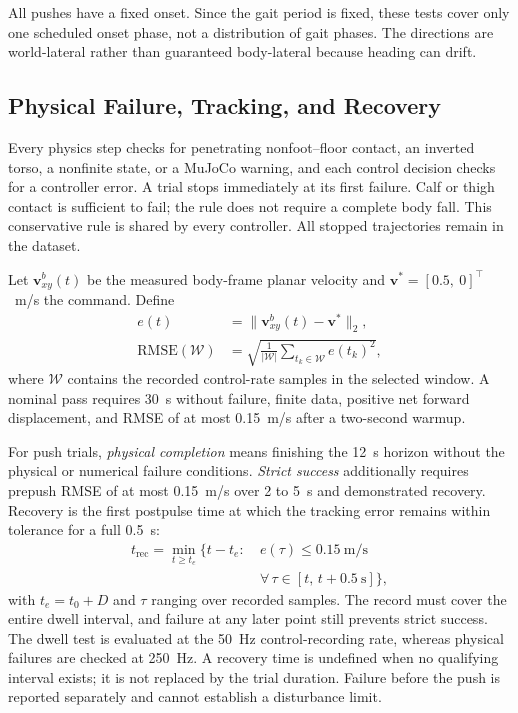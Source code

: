 \documentclass[conference]{IEEEtran}
\begin{document}
All pushes have a fixed onset. Since the gait period is fixed, these tests cover only one scheduled onset phase, not a distribution of gait phases. The directions are world-lateral rather than guaranteed body-lateral because heading can drift.

\subsection{Physical Failure, Tracking, and Recovery}

Every physics step checks for penetrating nonfoot--floor contact, an inverted torso, a nonfinite state, or a MuJoCo warning, and each control decision checks for a controller error. A trial stops immediately at its first failure. Calf or thigh contact is sufficient to fail; the rule does not require a complete body fall. This conservative rule is shared by every controller. All stopped trajectories remain in the dataset.

Let $\mathbf v_{xy}^{b}(t)$ be the measured body-frame planar velocity and $\mathbf v^*=[0.5,\ 0]^{\top}$~m/s the command. Define
\begin{equation}
\begin{aligned}
e(t)&=\bigl\|\mathbf v_{xy}^{b}(t)-\mathbf v^*\bigr\|_2,\\
\mathrm{RMSE}(\mathcal W)&=\sqrt{\frac{1}{|\mathcal W|}\sum_{t_k\in\mathcal W}e(t_k)^2},
\end{aligned}
\label{eq:rmse}
\end{equation}
where $\mathcal W$ contains the recorded control-rate samples in the selected window. A nominal pass requires 30~s without failure, finite data, positive net forward displacement, and RMSE of at most 0.15~m/s after a two-second warmup.

For push trials, \emph{physical completion} means finishing the 12~s horizon without the physical or numerical failure conditions. \emph{Strict success} additionally requires prepush RMSE of at most 0.15~m/s over 2 to 5~s and demonstrated recovery. Recovery is the first postpulse time at which the tracking error remains within tolerance for a full 0.5~s:
\begin{equation}
\begin{aligned}
t_{\mathrm{rec}}=\min_{t\geq t_e}\bigl\{t-t_e:\ &e(\tau)\leq 0.15~\mathrm{m/s}\\
&\forall\,\tau\in[t,\,t+0.5~\mathrm{s}]\bigr\},
\end{aligned}
\label{eq:recovery}
\end{equation}
with $t_e=t_0+D$ and $\tau$ ranging over recorded samples. The record must cover the entire dwell interval, and failure at any later point still prevents strict success. The dwell test is evaluated at the 50~Hz control-recording rate, whereas physical failures are checked at 250~Hz. A recovery time is undefined when no qualifying interval exists; it is not replaced by the trial duration. Failure before the push is reported separately and cannot establish a disturbance limit.
\end{document}

